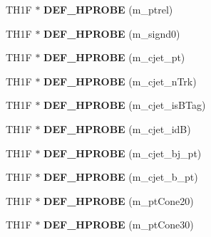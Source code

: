 \begin{DoxyCompactItemize}
\item 
\hypertarget{classHistos__Fake_ab8aa13c10b36adc49c37b27f2c39137b}{
TH1F $\ast$ {\bfseries DEF\_\-HPROBE} (m\_\-ptrel)}
\label{classHistos__Fake_ab8aa13c10b36adc49c37b27f2c39137b}

\item 
\hypertarget{classHistos__Fake_a4e9e5d5d4e980c0fa87784da50d9e6b7}{
TH1F $\ast$ {\bfseries DEF\_\-HPROBE} (m\_\-signd0)}
\label{classHistos__Fake_a4e9e5d5d4e980c0fa87784da50d9e6b7}

\item 
\hypertarget{classHistos__Fake_aeb715eed3c5d02bd8bb4e984d7e9747a}{
TH1F $\ast$ {\bfseries DEF\_\-HPROBE} (m\_\-cjet\_\-pt)}
\label{classHistos__Fake_aeb715eed3c5d02bd8bb4e984d7e9747a}

\item 
\hypertarget{classHistos__Fake_a9b7ea1ffc7fa3126ebb41296756b404e}{
TH1F $\ast$ {\bfseries DEF\_\-HPROBE} (m\_\-cjet\_\-nTrk)}
\label{classHistos__Fake_a9b7ea1ffc7fa3126ebb41296756b404e}

\item 
\hypertarget{classHistos__Fake_a9a8c587e5cff12a4884967d4cfe7cac3}{
TH1F $\ast$ {\bfseries DEF\_\-HPROBE} (m\_\-cjet\_\-isBTag)}
\label{classHistos__Fake_a9a8c587e5cff12a4884967d4cfe7cac3}

\item 
\hypertarget{classHistos__Fake_af207875007d7b2b3ef78c9eeb35549af}{
TH1F $\ast$ {\bfseries DEF\_\-HPROBE} (m\_\-cjet\_\-idB)}
\label{classHistos__Fake_af207875007d7b2b3ef78c9eeb35549af}

\item 
\hypertarget{classHistos__Fake_a1d655c8721b48d643bf0dfe98c89ffbf}{
TH1F $\ast$ {\bfseries DEF\_\-HPROBE} (m\_\-cjet\_\-bj\_\-pt)}
\label{classHistos__Fake_a1d655c8721b48d643bf0dfe98c89ffbf}

\item 
\hypertarget{classHistos__Fake_aa5fbd50f859b2e23772b7ca10c5fa4d4}{
TH1F $\ast$ {\bfseries DEF\_\-HPROBE} (m\_\-cjet\_\-b\_\-pt)}
\label{classHistos__Fake_aa5fbd50f859b2e23772b7ca10c5fa4d4}

\item 
\hypertarget{classHistos__Fake_ade2b05525e836ad6b74a3ea9fc4bbd3e}{
TH1F $\ast$ {\bfseries DEF\_\-HPROBE} (m\_\-ptCone20)}
\label{classHistos__Fake_ade2b05525e836ad6b74a3ea9fc4bbd3e}

\item 
\hypertarget{classHistos__Fake_a9ca80d767a7def6808d196ecfc419673}{
TH1F $\ast$ {\bfseries DEF\_\-HPROBE} (m\_\-ptCone30)}
\label{classHistos__Fake_a9ca80d767a7def6808d196ecfc419673}


\end{DoxyCompactItemize}

